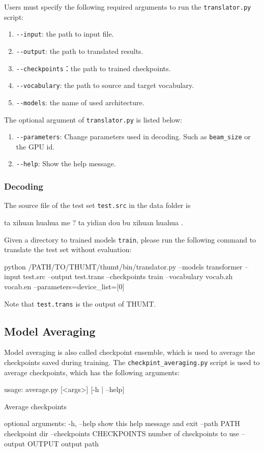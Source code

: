 \documentclass{article}
\begin{document}
Users must specify the following required arguments to run the \verb|translator.py| script:

\begin{enumerate}
\item \verb|--input|: the path to input file.
\item \verb|--output|: the path to translated results.
\item \verb|--checkpoints|：the path to trained checkpoints.
\item \verb|--vocabulary|: the path to source and target vocabulary.
\item \verb|--models|: the name of used architecture.
\end{enumerate}

The optional argument of \verb|translator.py| is listed below:
\begin{enumerate}
\item \verb|--parameters|: Change parameters used in decoding. Such as \verb|beam_size| or the GPU id.
\item \verb|--help|: Show the help message.
\end{enumerate}

\subsubsection{Decoding}
The source file of the test set \verb|test.src| in the data folder is
\begin{everbatim}
ta xihuan huahua me ?
ta yidian dou bu xihuan huahua .
\end{everbatim}

Given a directory to trained models \verb|train|, please run the following command to translate the test set without evaluation:

\begin{everbatim}
python /PATH/TO/THUMT/thumt/bin/translator.py
  --models transformer
  --input test.src
  --output test.trans
  --checkpoints train
  --vocabulary vocab.zh vocab.en
  --parameters=device_list=[0]
\end{everbatim}
Note that \verb|test.trans| is the output of THUMT.

\subsection{Model Averaging}
Model averaging is also called checkpoint ensemble, which is used to average the checkpoints saved during training. The \verb|checkpint_averaging.py| script is used to average checkpoints, which has the following arguments:
\begin{everbatim}
usage: average.py [<args>] [-h | --help]

Average checkpoints

optional arguments:
  -h, --help            show this help message and exit
  --path PATH           checkpoint dir
  --checkpoints CHECKPOINTS
                        number of checkpoints to use
  --output OUTPUT       output path
\end{everbatim}
\end{document}
